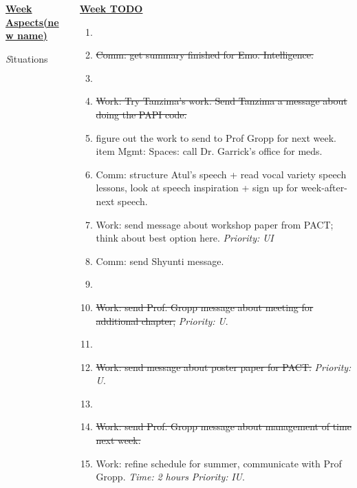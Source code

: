 \documentclass[serif,mathserif,final]{beamer}
\newcommand{\doneTask}[1]{\item \sout{#1}}
\newcommand{\timeEst}[1]{\textit{Time:} \textit{#1}}
\newcommand{\priority}[1]{\textit{Priority:} \textit{#1}}
\begin{document}
\begin{frame}{}
\begin{columns}[t]
\begin{column}{0.30\linewidth} {\textbf{\underline{Week Aspects(new name)}}}
\begin{block}{\textit Situations}
\begin{itemize}
    \end{itemize}
  \end{block} 
\end{column} %

\begin{column}{0.33\linewidth}{\textbf{\underline{Week TODO}}}


\begin{block}


\begin{enumerate} 

\item \tiny \doneTask{ Comm: get summary finished for Emo. Intelligence. } 

\item \tiny \doneTask{ Work: Try Tanzima's work. Send Tanzima a message about
  doing the PAPI code. }

\item \tiny figure out the work to send to Prof Gropp for next week. 
item \tiny Mgmt: Spaces: call Dr. Garrick's office for meds. 
\item \tiny Comm: structure Atul's speech + read vocal variety speech
  lessons, look at speech inspiration + sign up for week-after-next
  speech. 

\item \tiny Work: send message about workshop paper from PACT; think
  about best option here. \priority{UI} 

\item \tiny Comm: send Shyunti message. 

\item \tiny \doneTask{Work: send Prof. Gropp message about meeting for
  additional chapter, }\priority{U}.
\item \tiny \doneTask{Work: send message about poster paper for PACT.}
  \priority{U}. 
\item \tiny \doneTask{Work: send Prof. Gropp message about management of time
  next week.} 
\item \tiny Work: refine schedule for summer, communicate with Prof
  Gropp. \timeEst{2 hours} \priority{IU}. 


\end{enumerate}
\end{block}
\end{column}
\end{columns}
\end{frame}
\end{document}
